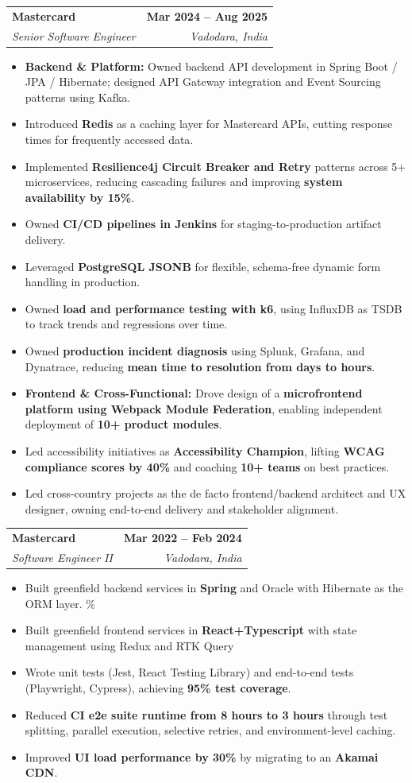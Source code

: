 \documentclass[letterpaper,11pt]{article}
\makeatletter
\newcommand{\resumeItem}[1]{
  \item\small{
    {#1 \vspace{-3pt}}
  }
}
\newcommand{\resumeSubheading}[4]{
  \vspace{-3pt}\item
    \begin{tabular*}{1.0\textwidth}[t]{l@{\extracolsep{\fill}}r}
      \textbf{#1} & \textbf{\small #2} \\
      \textit{\small#3} & \textit{\small #4} \\
    \end{tabular*}\vspace{-7pt}
}
\newcommand{\resumeItemListStart}{\begin{itemize}}
\newcommand{\resumeItemListEnd}{\end{itemize}\vspace{0pt}}
\makeatother
\begin{document}
    \resumeSubheading
      {Mastercard}{Mar 2024 -- Aug 2025}
      {Senior Software Engineer}{Vadodara, India}
      \resumeItemListStart
        \resumeItem{\textbf{Backend \& Platform:} Owned backend API development in Spring Boot / JPA / Hibernate; designed API Gateway integration and Event Sourcing patterns using Kafka.}
        \resumeItem{Introduced \textbf{Redis} as a caching layer for Mastercard APIs, cutting response times for frequently accessed data.}
        \resumeItem{Implemented \textbf{Resilience4j Circuit Breaker and Retry} patterns across 5+ microservices, reducing cascading failures and improving \textbf{system availability by 15\%}.}
        \resumeItem{Owned \textbf{CI/CD pipelines in Jenkins} for staging-to-production artifact delivery.}
        \resumeItem{Leveraged \textbf{PostgreSQL JSONB} for flexible, schema-free dynamic form handling in production.}
        \resumeItem{Owned \textbf{load and performance testing with k6}, using InfluxDB as TSDB to track trends and regressions over time.}
        \resumeItem{Owned \textbf{production incident diagnosis} using Splunk, Grafana, and Dynatrace, reducing \textbf{mean time to resolution from days to hours}.}
        \resumeItem{\textbf{Frontend \& Cross-Functional:} Drove design of a \textbf{microfrontend platform using Webpack Module Federation}, enabling independent deployment of \textbf{10+ product modules}.}
        \resumeItem{Led accessibility initiatives as \textbf{Accessibility Champion}, lifting \textbf{WCAG compliance scores by 40\%} and coaching \textbf{10+ teams} on best practices.}
        \resumeItem{Led cross-country projects as the de facto frontend/backend architect and UX designer, owning end-to-end delivery and stakeholder alignment.}
      \resumeItemListEnd

    \resumeSubheading
      {Mastercard}{Mar 2022 -- Feb 2024}
      {Software Engineer II}{Vadodara, India}
      \resumeItemListStart
        \resumeItem{Built greenfield backend services in \textbf{Spring} and Oracle with Hibernate as the ORM layer.
    \%}
        \resumeItem{Built greenfield frontend services in \textbf{React+Typescript} with state management using Redux and RTK Query}
        \resumeItem{Wrote unit tests (Jest, React Testing Library) and end-to-end tests (Playwright, Cypress), achieving \textbf{95\% test coverage}.}
        \resumeItem{Reduced \textbf{CI e2e suite runtime from 8 hours to 3 hours} through test splitting, parallel execution, selective retries, and environment-level caching.}
        \resumeItem{Improved \textbf{UI load performance by 30\%} by migrating to an \textbf{Akamai CDN}.}
      \resumeItemListEnd
\end{document}
